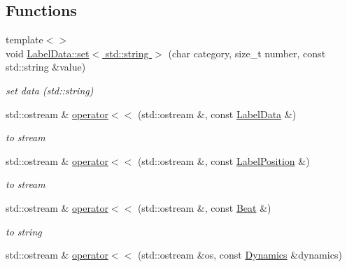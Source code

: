 \subsection*{\-Functions}
\begin{DoxyCompactItemize}
\item 
\hypertarget{namespacesinsy_ab863b29677920ea1c88d381251c841d7}{{\footnotesize template$<$$>$ }\\void \hyperlink{namespacesinsy_ab863b29677920ea1c88d381251c841d7}{\-Label\-Data\-::set$<$ std\-::string $>$} (char category, size\-\_\-t number, const std\-::string \&value)}\label{namespacesinsy_ab863b29677920ea1c88d381251c841d7}

\begin{DoxyCompactList}\small\item\em set data (std\-::string) \end{DoxyCompactList}\item 
\hypertarget{namespacesinsy_aa918aed79e292875d438af7921c3460a}{std\-::ostream \& \hyperlink{namespacesinsy_aa918aed79e292875d438af7921c3460a}{operator$<$$<$} (std\-::ostream \&, const \hyperlink{classsinsy_1_1LabelData}{\-Label\-Data} \&)}\label{namespacesinsy_aa918aed79e292875d438af7921c3460a}

\begin{DoxyCompactList}\small\item\em to stream \end{DoxyCompactList}\item 
\hypertarget{namespacesinsy_a9cb6b5fa2431566f684307ec1e6aa0c2}{std\-::ostream \& \hyperlink{namespacesinsy_a9cb6b5fa2431566f684307ec1e6aa0c2}{operator$<$$<$} (std\-::ostream \&, const \hyperlink{classsinsy_1_1LabelPosition}{\-Label\-Position} \&)}\label{namespacesinsy_a9cb6b5fa2431566f684307ec1e6aa0c2}

\begin{DoxyCompactList}\small\item\em to stream \end{DoxyCompactList}\item 
\hypertarget{namespacesinsy_aaa9cd0461519e76bdebc74329c25851c}{std\-::ostream \& \hyperlink{namespacesinsy_aaa9cd0461519e76bdebc74329c25851c}{operator$<$$<$} (std\-::ostream \&, const \hyperlink{classsinsy_1_1Beat}{\-Beat} \&)}\label{namespacesinsy_aaa9cd0461519e76bdebc74329c25851c}

\begin{DoxyCompactList}\small\item\em to string \end{DoxyCompactList}\item 
\hypertarget{namespacesinsy_adf7675441af20b7cbaa8f08d0bd3a7dc}{std\-::ostream \& \hyperlink{namespacesinsy_adf7675441af20b7cbaa8f08d0bd3a7dc}{operator$<$$<$} (std\-::ostream \&os, const \hyperlink{classsinsy_1_1Dynamics}{\-Dynamics} \&dynamics)}\label{namespacesinsy_adf7675441af20b7cbaa8f08d0bd3a7dc}


\end{DoxyCompactItemize}
